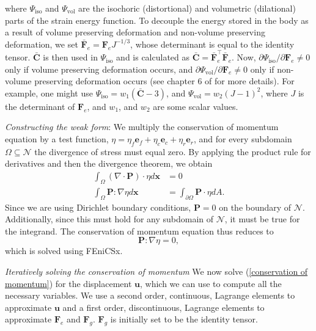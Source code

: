 where $\Psi_\text{iso}$ and $\Psi_\text{vol}$ are the isochoric (distortional) and volumetric (dilational) parts of the strain energy function. To decouple the energy stored in the body as a result of volume preserving deformation and non-volume preserving deformation, we set $\mathbf{\bar{F}}_e = \mathbf{F}_eJ^{-1/3}$, whose determinant is equal to the identity tensor. $\mathbf{\bar{C}}$ is then used in $\Psi_\text{iso}$ and is calculated as $\mathbf{\bar{C}} = \mathbf{\bar{F}}_e^\top \mathbf{\bar{F}}_e$. Now, $\partial\Psi_\text{iso}/\partial \mathbf{F}_e \neq 0$ only if volume preserving deformation occurs, and $\partial\Psi_\text{vol}/\partial \mathbf{F}_e \neq 0$ only if non-volume preserving deformation occurs (see chapter 6 of \cite{Holzapfel2002} for more details). For example, one might use $\Psi_\text{iso} = w_1\left(\mathbf{\bar{C}} - 3\right)$, and $\Psi_\text{vol} = w_2(J-1)^2$, where $J$ is the determinant of $\mathbf{F}_e$, and $w_1$, and $w_2$ are some scalar values. \par
\emph{Constructing the weak form}: We multiply the conservation of momentum equation by a test function, $\eta =  \eta_f\mathbf{e}_f + \eta_c\mathbf{e}_c + \eta_r\mathbf{e}_r$, and for every subdomain $\Omega \subseteq \mathcal{N}$ the divergence of stress must equal zero. By applying the product rule for derivatives and then the divergence theorem, we obtain
\begin{align*}
    \int_\Omega(\nabla\cdot\mathbf{P})\cdot\eta d\mathbf{x} &= 0 \\
    \int_\Omega \mathbf{P} : \nabla\eta d\mathbf{x} &= \int_{\partial\Omega}\mathbf{P}\cdot\eta dA.
\end{align*}
Since we are using Dirichlet boundary conditions, $\mathbf{P} = 0$ on the boundary of $\mathcal{N}$. Additionally, since this must hold for any subdomain of $\mathcal{N}$, it must be true for the integrand. The conservation of momentum equation thus reduces to
\begin{equation}
\label{conservation of momentum}
    \mathbf{P} : \nabla\eta = 0,
\end{equation}
which is solved using FEniCSx.
\par
\emph{Iteratively solving the conservation of momentum}
We now solve (\ref{conservation of momentum}) for the displacement $\mathbf{u}$, which we can use to compute all the necessary variables. We use a second order, continuous, Lagrange elements to approximate $\mathbf{u}$ and a first order, discontinuous, Lagrange elements to approximate $\mathbf{F}_e$ and $\mathbf{F}_g$. $\mathbf{F}_g$ is initially set to be the identity tensor. \par
